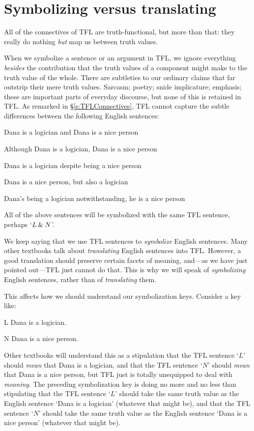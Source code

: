 \section{Symbolizing versus translating}
All of the connectives of TFL are truth-functional, but more than that: they really do nothing \emph{but} map us between truth values.

When we symbolize a sentence or an argument in TFL, we ignore everything \emph{besides} the contribution that the truth values of a component might make to the truth value of the whole. There are subtleties to our ordinary claims that far outstrip their mere truth values. Sarcasm; poetry; snide implicature; emphasis; these are important parts of everyday discourse, but none of this is retained in TFL. As remarked in \S\ref{s:TFLConnectives}, TFL cannot capture the subtle differences between the following English sentences:
	\begin{earg}
		\item Dana is a logician and Dana is a nice person
		\item Although Dana is a logician, Dana is a nice person
		\item Dana is a logician despite being a nice person
		\item Dana is a nice person, but also a logician
		\item Dana's being a logician notwithstanding, he is a nice person
	\end{earg}
All of the above sentences will be symbolized with the same TFL sentence, perhaps `$L \mathbin{\&} N$'.

We keep saying that we use TFL sentences to \emph{symbolize} English sentences. Many other textbooks talk about \emph{translating} English sentences into TFL. However, a good translation should preserve certain facets of meaning, and---as we have just pointed out---TFL just cannot do that. This is why we will speak of \emph{symbolizing} English sentences, rather than of \emph{translating} them.

This affects how we should understand our symbolization keys. Consider a key like:
	\begin{ekey}
		\item[L] Dana is a logician.
		\item[N] Dana is a nice person.
	\end{ekey}
Other textbooks will understand this as a stipulation that the TFL sentence `$L$' should \emph{mean} that Dana is a logician, and that the TFL sentence `$N$' should \emph{mean} that Dana is a nice person, but TFL just is totally unequipped to deal with \emph{meaning}. The preceding symbolization key is doing no more and no less than stipulating that the TFL sentence `$L$' should take the same truth value as the English sentence `Dana is a logician' (whatever that might be), and that the TFL sentence `$N$' should take the same truth value as the English sentence `Dana is a nice person' (whatever that might be).




